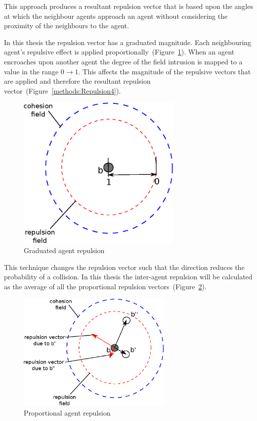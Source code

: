 This approach produces a resultant repulsion vector that is based upon the angles at which the neighbour agents approach an agent without considering the proximity of the neighbours to the agent. 

In this thesis the repulsion vector has a graduated magnitude. Each neighbouring agent's repulsive effect is applied proportionally~(Figure~\ref{methods:Repulsion1}). When an agent encroaches upon another agent the degree of the field intrusion is mapped to a value in the range $0 \rightarrow 1$. This affects the magnitude of the repulsive vectors that are applied and therefore the resultant repulsion vector~(Figure~\ref{methods:Repulsion4}). 

\begin{figure}[H]
\begin{center}
\includegraphics[width=8cm]{CHAPTER-2/figures/Repulsion1}
\caption{Graduated agent repulsion \label{methods:Repulsion1}}
\end{center}
\end{figure}

This technique changes the repulsion vector such that the direction reduces the probability of a collision. In this thesis the inter-agent repulsion will be calculated as the average of all the proportional repulsion vectors~(Figure~\ref{methods:Repulsion2}). 
 
\begin{figure}[H]
\begin{center}
\includegraphics[width=7.5cm]{CHAPTER-2/figures/Repulsion2}
\caption{Proportional agent repulsion \label{methods:Repulsion2}}
\end{center}
\end{figure}

